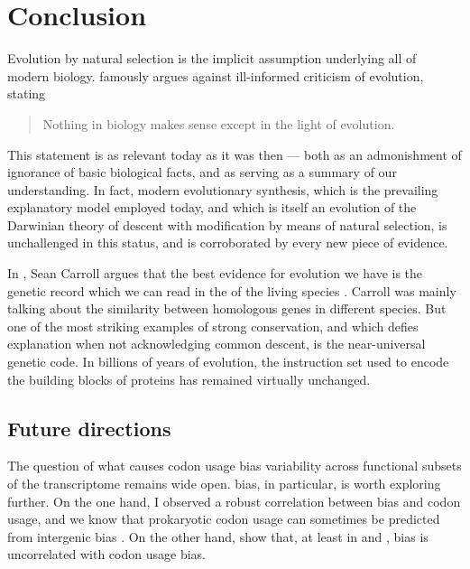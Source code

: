 \chapter{Conclusion}


\noindent
Evolution by natural selection is the implicit assumption underlying all of
modern biology. \citet{Dobzhansky:1973} famously argues against ill-informed
criticism of evolution, stating

\begin{quote}
    Nothing in biology makes sense except in the light of evolution.
\end{quote}

This statement is as relevant today as it was then --- both as an admonishment
of ignorance of basic biological facts, and as serving as a summary of our
understanding. In fact, modern evolutionary synthesis, which is the prevailing
explanatory model employed today, and which is itself an evolution of the
Darwinian theory of descent with modification by means of natural selection, is
unchallenged in this status, and is corroborated by every new piece of evidence.

In , Sean Carroll argues that the best
evidence for evolution we have is the genetic record which we can read in the
\dna of the living species \citep{Carroll:2006}. Carroll was mainly talking
about the similarity between homologous genes in different species. But one of
the most striking examples of strong conservation, and which defies explanation
when not acknowledging common descent, is the near-universal genetic code. In
billions of years of evolution, the instruction set used to encode the building
blocks of proteins has remained virtually unchanged.


\section{Future directions}

The question of what causes codon usage bias variability across functional
subsets of the transcriptome remains wide open. \gc bias, in particular, is
worth exploring further. On the one hand, I observed a robust correlation
between \gc bias and codon usage, and we know that prokaryotic codon usage can
sometimes be predicted from intergenic \gc bias \citep{Chen:2004}. On the other
hand, \citet{Duret:2002} show that, at least in  and
, \gc bias is uncorrelated with codon usage bias.

